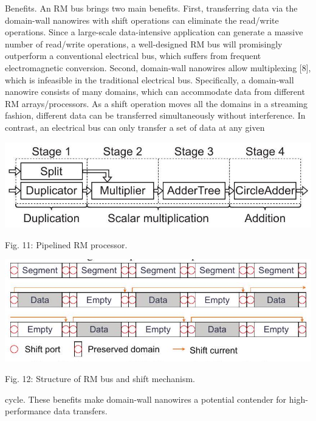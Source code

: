 \documentclass[10pt]{article}
\begin{document}
Benefits. An RM bus brings two main benefits. First, transferring data via the domain-wall nanowires with shift operations can eliminate the read/write operations. Since a large-scale data-intensive application can generate a massive number of read/write operations, a well-designed RM bus will promisingly outperform a conventional electrical bus, which suffers from frequent electromagnetic conversion. Second, domain-wall nanowires allow multiplexing [8], which is infeasible in the traditional electrical bus. Specifically, a domain-wall nanowire consists of many domains, which can accommodate data from different RM arrays/processors. As a shift operation moves all the domains in a streaming fashion, different data can be transferred simultaneously without interference. In contrast, an electrical bus can only transfer a set of data at any given

\begin{center}
\includegraphics[max width=\textwidth]{2024_05_12_abeba8a85da5b5ec4c7bg-06}
\end{center}

Fig. 11: Pipelined RM processor.

\begin{center}
\includegraphics[max width=\textwidth]{2024_05_12_abeba8a85da5b5ec4c7bg-06(2)}
\end{center}

Fig. 12: Structure of RM bus and shift mechanism.

cycle. These benefits make domain-wall nanowires a potential contender for high-performance data transfers.
\end{document}
